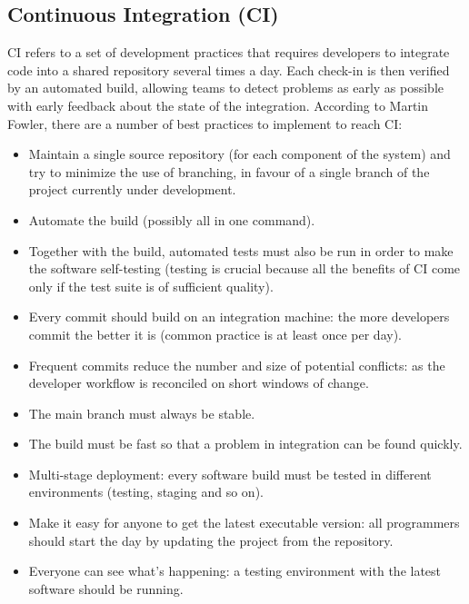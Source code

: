 \documentclass[a4paper,
               keeplastbox,   %
               ]{jacow}
\begin{document}
\subsection{Continuous Integration (CI)}
CI refers to a set of development practices that requires developers to integrate code into a shared repository several times a day. Each check-in is then verified by an automated build, allowing teams to detect problems as early as possible with early feedback about the state of the integration.
According to Martin Fowler\cite{CI}, there are a number of best practices to implement to reach CI:
\begin{itemize}
    \item Maintain a single source repository (for each component of the system) and try to minimize the use of branching, in favour of a single branch of the project currently under development.
    \item Automate the build (possibly all in one command).
    \item Together with the build, automated tests must also be run in order to make the software self-testing (testing is crucial because all the benefits of CI come only if the test suite is of sufficient quality).
    \item Every commit should build on an integration machine: the more developers commit the better it is (common practice is at least once per day).
    \item Frequent commits reduce the number and size of potential conflicts: as the developer workflow is reconciled on short windows of change.
    \item The main branch must always be stable.
    \item The build must be fast so that a problem in integration can be found quickly.
    \item Multi-stage deployment: every software build must be tested in different environments (testing, staging and so on).
    \item Make it easy for anyone to get the latest executable version: all programmers should start the day by updating the project from the repository.
    \item Everyone can see what’s happening: a testing environment with the latest software should be running.
\end{itemize}
\end{document}
